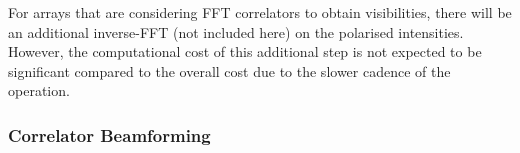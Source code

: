 \documentclass[
  journal=pasa,
  manuscript=article-type,
  year=2020,
  volume=37,
]{cup-journal}
\begin{document}
For arrays that are considering FFT correlators to obtain visibilities, there will be an additional inverse-FFT (not included here) on the polarised intensities. However, the computational cost of this additional step is not expected to be significant compared to the overall cost due to the slower cadence of the operation.


\subsubsection{Correlator Beamforming}
\end{document}
